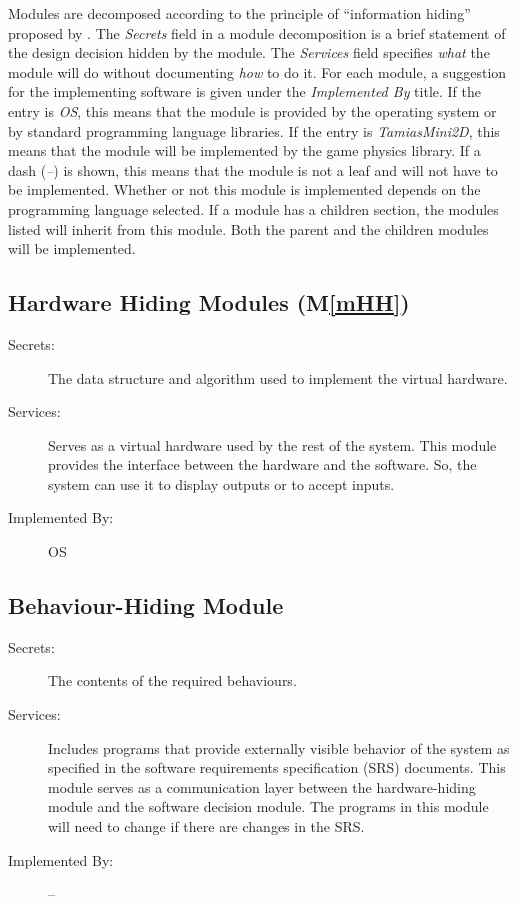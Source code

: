 \documentclass[12pt]{article}
\newcommand{\mref}[1]{M\ref{#1}}
\begin{document}
Modules are decomposed according to the principle of ``information hiding''
proposed by \citet{ParnasEtAl1984}. The \emph{Secrets} field in a module
decomposition is a brief statement of the design decision hidden by the
module. The \emph{Services} field specifies \emph{what} the module will do
without documenting \emph{how} to do it. For each module, a suggestion for the implementing software is given under the \emph{Implemented By} title. If the entry is \emph{OS}, this means that the module is provided by the operating system or by standard programming language libraries. If the entry is \emph{TamiasMini2D}, this means that the module will be implemented by the game physics library.  
If a dash (\emph{--}) is shown, this means
that the module is not a leaf and will not have to be implemented. Whether or
not this module is implemented depends on the programming language
selected.
If a module has a children section, the modules listed will inherit from  
this module. Both the parent and the children modules will be implemented.

\subsection{Hardware Hiding Modules (\mref{mHH})}

\begin{description}
\item[Secrets:]The data structure and algorithm used to implement the virtual
  hardware.
\item[Services:] Serves as a virtual hardware used by the rest of the
  system. This module provides the interface between the hardware and the
  software. So, the system can use it to display outputs or to accept inputs.
\item[Implemented By:] OS
\end{description}

\subsection{Behaviour-Hiding Module}

\begin{description}
\item[Secrets:]The contents of the required behaviours.
\item[Services:]Includes programs that provide externally visible behavior of
  the system as specified in the software requirements specification (SRS)
  documents. This module serves as a communication layer between the
  hardware-hiding module and the software decision module. The programs in this module will need to change if there are changes in the SRS.
\item[Implemented By:] --
\end{description}
\end{document}
